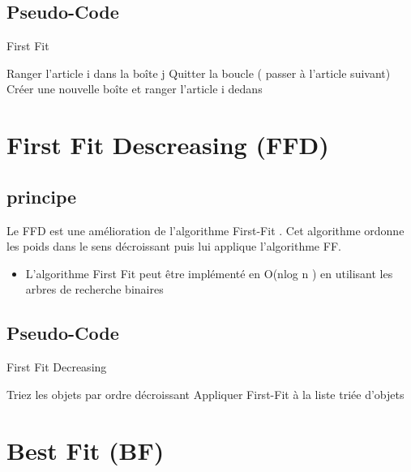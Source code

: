 \documentclass[class=article, crop=false]{standalone}
\begin{document}
\subsection{Pseudo-Code}
\begin{algorithm}[H]
    \caption{First Fit}
    \begin{algorithmic}
              \STATE Ranger l’article i dans la boîte j
              \STATE Quitter la boucle ( passer à l'article suivant)
             \ENDIF 
        \ENDFOR
            \STATE Créer une nouvelle boîte et ranger l’article i dedans
        \ENDIF
    \ENDFOR
    \end{algorithmic}
\end{algorithm}

\section{First Fit Descreasing (FFD)}
\subsection{principe}
Le FFD est une amélioration de l’algorithme First-Fit . Cet algorithme ordonne les poids dans le sens décroissant puis lui applique l’algorithme FF.
\begin{itemize}
    \item L’algorithme First Fit peut être implémenté en O(nlog n ) en utilisant les arbres de recherche binaires 
\end{itemize}

\subsection{Pseudo-Code}
\begin{algorithm}
    \caption{First Fit Decreasing }
    \begin{algorithmic}
        \STATE Triez les objets par ordre décroissant
        \STATE Appliquer First-Fit à la liste triée d'objets
    \end{algorithmic}
\end{algorithm}


\section{Best Fit (BF)}
\end{document}
